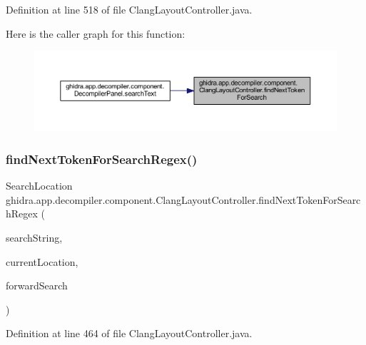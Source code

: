 Definition at line 518 of file Clang\+Layout\+Controller.\+java.

Here is the caller graph for this function\+:
\nopagebreak
\begin{figure}[H]
\begin{center}
\leavevmode
\includegraphics[width=350pt]{classghidra_1_1app_1_1decompiler_1_1component_1_1_clang_layout_controller_a29b3cb592a6102b6f21f158982d3cad0_icgraph}
\end{center}
\end{figure}
\mbox{\label{classghidra_1_1app_1_1decompiler_1_1component_1_1_clang_layout_controller_a74194987b87afc9153d669bcc8bf9453}} 
\subsubsection{\texorpdfstring{findNextTokenForSearchRegex()}{findNextTokenForSearchRegex()}}
{\footnotesize\ttfamily Search\+Location ghidra.\+app.\+decompiler.\+component.\+Clang\+Layout\+Controller.\+find\+Next\+Token\+For\+Search\+Regex (\begin{DoxyParamCaption}\item[{String}]{search\+String,  }\item[{Field\+Location}]{current\+Location,  }\item[{boolean}]{forward\+Search }\end{DoxyParamCaption})\hspace{0.3cm}{\ttfamily [inline]}}



Definition at line 464 of file Clang\+Layout\+Controller.\+java.

